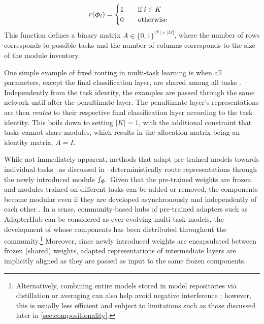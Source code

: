 \documentclass[10pt]{article} %
\begin{document}
\begin{equation}
r({\bm{\phi}}_i) = 
   \begin{cases}
       1 \qquad \mathrm{if} \, i \in K\\
       0 \qquad \mathrm{otherwise}
   \end{cases}
\end{equation} 
This function defines a binary matrix $A \in \{0, 1\}^{|\mathcal{T}| \times |M|}$, where the number of rows corresponds to possible tasks and the number of columns corresponds to the size of the module inventory.

One simple example of fixed routing in multi-task learning is when all parameters, except the final classification layer, are shared among all tasks \citep{ruder2017overview}. Independently from the task identity, the examples are passed through the same network until after the penultimate layer. The penultimate layer's representations are then \textit{routed} to their respective final classification layer according to the task identity. This boils down to setting $|K| = 1$, with the additional constraint that tasks cannot share modules, which results in the allocation matrix being an identity matrix, $A = I$.  

While not immediately apparent, methods that adapt pre-trained models towards individual tasks \cite[][\textit{inter alia}]{Rebuffi2017Adapters1,Rebuffi2018Adapters2, houlsby2019parameter,Bapna2019Adapters, Li2020PrefixTuning, Liu2022IA3,hu2021lora, ansell2021composable,ben-zaken-etal-2022-bitfit}--as discussed in --deterministically route representations through the newly introduced module $f_{\bm{\phi}}$.
Given that the pre-trained weights are frozen and modules trained on different tasks can be added or removed,
the components become modular even if they are developed asynchronously and independently of each other \citep{pfeiffer2020adapterfusion}. In a sense, community-based hubs of pre-trained adapters such as AdapterHub \citep{pfeiffer-etal-2020-adapterhub} can be considered as ever-evolving multi-task models, the development of whose components has been distributed throughout the community.\footnote{Alternatively, combining entire models stored in model repositories via distillation \citep{Khanuja2021} or averaging \citep{Matena2022} can also help avoid negative interference \citep{Shachar2022ColD}; however, this is usually less efficient and subject to  limitations such as those discussed later in \cref{sec:compositionality}.} 
Moreover, since newly introduced weights are encapsulated between frozen (shared) weights, adapted representations of intermediate layers are implicitly aligned as they are passed as input to the same frozen components.
\end{document}

